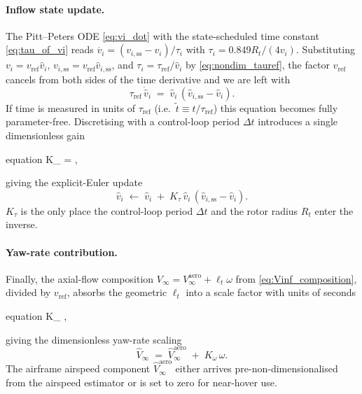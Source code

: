\documentclass[11pt,a4paper]{article}
\newcommand{\Rt}{R_t}
\newcommand{\vi}{v_i}
\newcommand{\viss}{v_{i,\text{ss}}}
\begin{document}
\paragraph{Inflow state update.}
The Pitt--Peters ODE \eqref{eq:vi_dot} with the state-scheduled time
constant \eqref{eq:tau_of_vi} reads \(\dot{\vi}=(\viss-\vi)/\tau_i\) with
\(\tau_i = 0.849\Rt/(4\vi)\). Substituting \(\vi=v_{\text{ref}}\hat{v}_i\),
\(\viss=v_{\text{ref}}\hat{v}_{i,\text{ss}}\), and
\(\tau_i = \tau_{\text{ref}}/\hat{v}_i\) by \eqref{eq:nondim_tauref}, the
factor \(v_{\text{ref}}\) cancels from both sides of the time derivative
and we are left with
\begin{equation}
\tau_{\text{ref}}\,\dot{\hat{v}}_i
\;=\; \hat{v}_i\,(\hat{v}_{i,\text{ss}} - \hat{v}_i).
\label{eq:nondim_state_ode}
\end{equation}
If time is measured in units of \(\tau_{\text{ref}}\) (i.e.\
\(\tilde{t}\equiv t/\tau_{\text{ref}}\)) this equation becomes fully
parameter-free. Discretising with a control-loop period \(\Delta t\)
introduces a single dimensionless gain
\begin{empheq}[box=\fbox]{equation}
K_\tau \;\equiv\; 
   \;=\; \frac{4\,v_{\text{ref}}\,\Delta t}{0.849\,\Rt},
\label{eq:nondim_C}
\end{empheq}
giving the explicit-Euler update
\begin{equation}
\hat{v}_i \;\leftarrow\; \hat{v}_i \;+\; K_\tau\,\hat{v}_i\,(\hat{v}_{i,\text{ss}} - \hat{v}_i).
\label{eq:nondim_state}
\end{equation}
\(K_\tau\) is the only place the control-loop period \(\Delta t\) and the rotor
radius \(\Rt\) enter the inverse.

\paragraph{Yaw-rate contribution.}
Finally, the axial-flow composition \(V_\infty = V_\infty^{\text{aero}} +
\ell_t\omega\) from \eqref{eq:Vinf_composition}, divided by
\(v_{\text{ref}}\), absorbs the geometric \(\ell_t\) into a scale factor
with units of seconds
\begin{empheq}[box=\fbox]{equation}
K_\omega \;\equiv\; ,
\label{eq:nondim_D}
\end{empheq}
giving the dimensionless yaw-rate scaling
\begin{equation}
\hat{V}_\infty \;=\; \hat{V}_\infty^{\text{aero}} \;+\; K_\omega\,\omega.
\label{eq:nondim_Vinf}
\end{equation}
The airframe airspeed component \(\hat{V}_\infty^{\text{aero}}\) either
arrives pre-non-dimensionalised from the airspeed estimator or is set
to zero for near-hover use.
\end{document}
